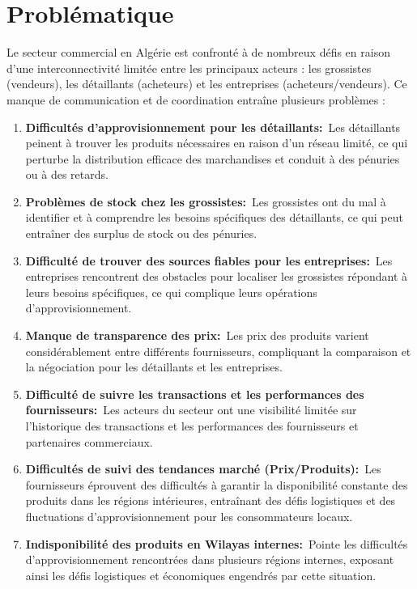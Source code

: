 \documentclass[edit,12pt,a4paper,ChapStyle,oneside,doubleinterligne]{report}
\begin{document}
\section{Problématique}
Le secteur commercial en Algérie est confronté à de nombreux défis en raison d'une interconnectivité limitée entre les principaux acteurs : les grossistes (vendeurs), les détaillants (acheteurs) et les entreprises (acheteurs/vendeurs). Ce manque de communication et de coordination entraîne plusieurs problèmes :
\begin{enumerate}
    \item \textbf{Difficultés d'approvisionnement pour les détaillants:}~Les détaillants peinent à trouver les produits nécessaires en raison d'un réseau limité, ce qui perturbe la distribution efficace des marchandises et conduit à des pénuries ou à des retards.
    \item \textbf{Problèmes de stock chez les grossistes:}~Les grossistes ont du mal à identifier et à comprendre les besoins spécifiques des détaillants, ce qui peut entraîner des surplus de stock ou des pénuries.
    \item \textbf{Difficulté de trouver des sources fiables pour les entreprises:}~Les entreprises rencontrent des obstacles pour localiser les grossistes répondant à leurs besoins spécifiques, ce qui complique leurs opérations d'approvisionnement.
    \item \textbf{Manque de transparence des prix:}~Les prix des produits varient considérablement entre différents fournisseurs, compliquant la comparaison et la négociation pour les détaillants et les entreprises.
    \item \textbf{Difficulté de suivre les transactions et les performances des fournisseurs:}~Les acteurs du secteur ont une visibilité limitée sur l'historique des transactions et les performances des fournisseurs et partenaires commerciaux.
    \item \textbf{Difficultés de suivi des tendances marché (Prix/Produits):}~Les fournisseurs éprouvent des difficultés à garantir la disponibilité constante des produits dans les régions intérieures, entraînant des défis logistiques et des fluctuations d'approvisionnement pour les consommateurs locaux.
    \item \textbf{Indisponibilité des produits en Wilayas internes:}~Pointe les difficultés d'approvisionnement rencontrées dans plusieurs régions internes, exposant ainsi les défis logistiques et économiques engendrés par cette situation.
\end{enumerate}
\end{document}
